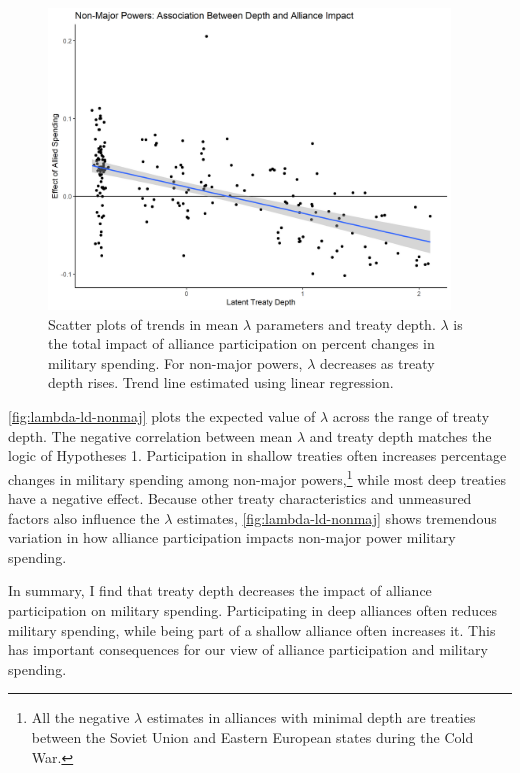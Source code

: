 \documentclass[12pt]{article}
\begin{document}
\begin{figure}[htbp]
	\centering
		\includegraphics[width=0.95\textwidth]{../figures/lambda-ld-nonmaj.png}
	\caption{Scatter plots of trends in mean $\lambda$ parameters and treaty depth. $\lambda$ is the total impact of alliance participation on percent changes in military spending. For non-major powers, $\lambda$ decreases as treaty depth rises. Trend line estimated using linear regression.}
	\label{fig:lambda-ld-nonmaj}
\end{figure}


\autoref{fig:lambda-ld-nonmaj} plots the expected value of $\lambda$ across the range of treaty depth. 
The negative correlation between mean $\lambda$ and treaty depth matches the logic of Hypotheses 1. 
Participation in shallow treaties often increases percentage changes in military spending among non-major powers,\footnote{All the negative $\lambda$ estimates in alliances with minimal depth are treaties between the Soviet Union and Eastern European states during the Cold War.} while most deep treaties have a negative effect. 
Because other treaty characteristics and unmeasured factors also influence the $\lambda$ estimates, \autoref{fig:lambda-ld-nonmaj} shows tremendous variation in how alliance participation impacts non-major power military spending. 


In summary, I find that treaty depth decreases the impact of alliance participation on military spending. 
Participating in deep alliances often reduces military spending, while being part of a shallow alliance often increases it. 
This has important consequences for our view of alliance participation and military spending. 
\end{document}
